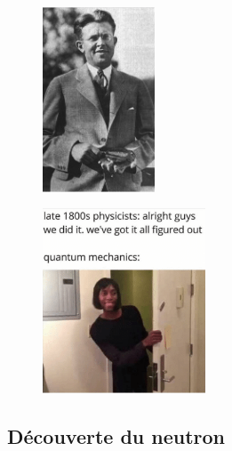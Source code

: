 \begin{figure}[ht]
    \centering
    \begin{minipage}{.5\textwidth}
        \centering
        \includegraphics[height=5.5cm]{Images1/cyclo.PNG}
        \label{fig:lawrence_cyclo}
    \end{minipage}%
    \begin{minipage}{.5\textwidth}
        \centering
        \includegraphics[height=5.5cm]{Images1/mama.png}
        \label{fig:to_be_continued}
    \end{minipage}
\end{figure}


\subsection{Découverte du neutron}


